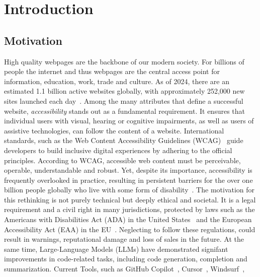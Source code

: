 
\chapter{Introduction}\label{chapter:introduction}

\section{Motivation}
High quality webpages are the backbone of our modern society. 
For billions of people the internet and thus webpages are the central access point 
for information, education, work, trade and culture. 
As of 2024, there are an estimated 1.1 billion active websites 
globally, with approximately 252,000 new sites launched each
day~\cite{web:website}.\newline
Among the many attributes that define a successful website, \emph{accessibility} stands 
out as a fundamental requirement. It ensures that individual users
with visual, hearing or cognitive
impairments, as well as users of assistive technologies, can follow the content
of a website.
International standards, such as the Web
Content Accessibility Guidelines (WCAG)~\cite{wcag21} guide developers 
to build inclusive digital experiences by adhering to the official 
principles. According to WCAG, accessible web content must be 
perceivable, operable, understandable and robust.
Yet, despite its importance, accessibility is frequently overlooked in
practice, resulting in persistent barriers for the over one billion people globally who live with some
form of disability~\cite{web:disability}.\newline
The motivation for this rethinking is not purely technical but deeply ethical and societal. It is a
legal requirement and a civil right in many jurisdictions, protected by laws such as the Americans
with Disabilities Act (ADA) in the United States~\cite{web:ADA1990} and the European Accessibility Act (EAA) in
the EU~\cite{web:EAA2019}. Neglecting to follow these regulations, could result in warnings,
reputational damage and loss of sales in the future.\newline
At the same time, Large-Language Models (LLMs) have demonstrated signifant 
improvements in code-related tasks, including code generation, completion and 
summarization. Current Tools, such as  GitHub Copilot~\cite{web:copilot}, 
Cursor~\cite{web:cursor}, Windsurf~\cite{web:windsurf},
